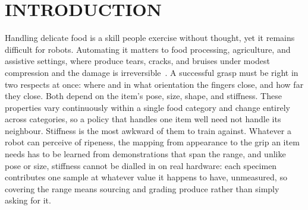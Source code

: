 %
%
%
\newcommand{\method}{\textsc{Method}}   %

\section{INTRODUCTION}

Handling delicate food is a skill people exercise without thought, yet it remains difficult
for robots. Automating it matters to food processing, agriculture, and assistive settings,
where produce tears, cracks, and bruises under modest compression and the damage is
irreversible~\cite{zhu2025deformable,blanco2024t,wang2025damageless}. A successful grasp must
be right in two respects at once: where and in what orientation the fingers close, and how far
they close. Both depend on the item's pose, size, shape, and stiffness. These properties
vary continuously within a single food category and change entirely across categories, so a
policy that handles one item well need not handle its neighbour. Stiffness is the most awkward
of them to train against. Whatever a robot can perceive of ripeness, the mapping from
appearance to the grip an item needs has to be learned from demonstrations that span the
range, and unlike pose or size, stiffness cannot be dialled in on real hardware: each specimen
contributes one sample at whatever value it happens to have, unmeasured, so covering the range
means sourcing and grading produce rather than simply asking for it.

